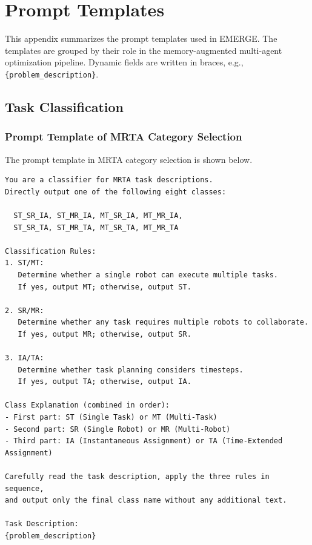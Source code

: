 \appendices
\section{Prompt Templates}
\label{app:prompt_templates}

This appendix summarizes the prompt templates used in EMERGE. The templates are
grouped by their role in the memory-augmented multi-agent optimization pipeline.
Dynamic fields are written in braces, e.g., \texttt{\{problem\_description\}}.


\subsection{Task Classification}

\subsubsection{Prompt Template of MRTA Category Selection}
\label{app:prompt_selector}

The prompt template in MRTA category selection is shown below.
\begin{lstlisting}[style=promptstyle]
You are a classifier for MRTA task descriptions.
Directly output one of the following eight classes:

  ST_SR_IA, ST_MR_IA, MT_SR_IA, MT_MR_IA,
  ST_SR_TA, ST_MR_TA, MT_SR_TA, MT_MR_TA

Classification Rules:
1. ST/MT:
   Determine whether a single robot can execute multiple tasks.
   If yes, output MT; otherwise, output ST.

2. SR/MR:
   Determine whether any task requires multiple robots to collaborate.
   If yes, output MR; otherwise, output SR.

3. IA/TA:
   Determine whether task planning considers timesteps.
   If yes, output TA; otherwise, output IA.

Class Explanation (combined in order):
- First part: ST (Single Task) or MT (Multi-Task)
- Second part: SR (Single Robot) or MR (Multi-Robot)
- Third part: IA (Instantaneous Assignment) or TA (Time-Extended Assignment)

Carefully read the task description, apply the three rules in sequence,
and output only the final class name without any additional text.

Task Description:
{problem_description}
\end{lstlisting}

